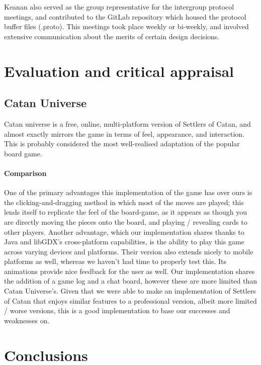 \documentclass[a4paper,doc]{apa6}
\begin{document}
Keanan also served as the group representative for the intergroup protocol meetings, and contributed to the GitLab repository which housed the protocol buffer files (.proto). This meetings took place weekly or bi-weekly, and involved extensive communication about the merits of certain design decisions. 

\section{Evaluation and critical appraisal}

\subsection{Catan Universe}
Catan universe is a free, online, multi-platform version of Settlers of Catan, and almost exactly mirrors the game in terms of feel, appearance, and interaction. This is probably considered the most well-realised adaptation of the popular board game.

\paragraph{Comparison}
One of the primary advantages this implementation of the game has over ours is the clicking-and-dragging method in which most of the moves are played; this lends itself to replicate the feel of the board-game, as it appears as though you are directly moving the pieces onto the board, and playing / revealing cards to other players. Another advantage, which our implementation shares thanks to Java and libGDX's cross-platform capabilities, is the ability to play this game across varying devices and platforms. Their version also extends nicely to mobile platforms as well, whereas we haven't had time to properly test this. Its animations provide nice feedback for the user as well. Our implementation shares the addition of a game log and a chat board, however these are more limited than Catan Universe's. Given that we were able to make an implementation of Settlers of Catan that enjoys similar features to a professional version, albeit more limited / worse versions, this is a good implementation to base our successes and weaknesses on.




\section{Conclusions}
\end{document}
